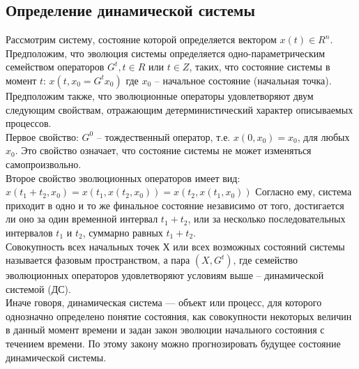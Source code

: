 \begin{multicols*}{2}
		\section{Определение динамической системы}
		Рассмотрим систему, состояние которой определяется вектором $x(t)\in R^n$.
		Предположим, что эволюция системы определяется одно-параметрическим семейством операторов $G^t, t \in R$ или $t \in Z$, таких, что состояние системы в момент $t$: $x(t, x_0 = G^t x_0)$
		где $x_0$ – начальное состояние (начальная точка). Предположим также, что эволюционные операторы удовлетворяют двум следующим свойствам,
		отражающим детерминистический характер описываемых процессов.\\
		Первое свойство: $G^0$ – тождественный оператор, т.е. $x(0,x_0 ) = x_0$, для любых $x_0$. Это свойство означает, что состояние системы не может изменяться самопроизвольно.\\
		Второе свойство эволюционных операторов имеет вид: $x(t_1+t_2, x_0) = x(t_1, x(t_2, x_0)) = x(t_2, x(t_1, x_0))$ Согласно ему, система приходит в одно и то же финальное состояние независимо от того, достигается ли оно за один временной интервал $t_1+t_2$, или за
		несколько последовательных интервалов $t_1$ и $t_2$, суммарно равных $t_1+t_2$.\\
		Совокупность всех начальных точек $Х$ или всех возможных состояний
		системы называется фазовым пространством, а пара $(X,{G^t})$, где семейство эволюционных операторов удовлетворяют условиям выше – динамической системой (ДС).\\
		Иначе говоря, динамическая система — объект или процесс, для которого однозначно определено понятие состояния, как совокупности некоторых величин в данный момент времени и задан закон эволюции начального состояния с течением времени. По этому закону можно прогнозировать будущее состояние динамической системы.
		

\end{multicols*}
